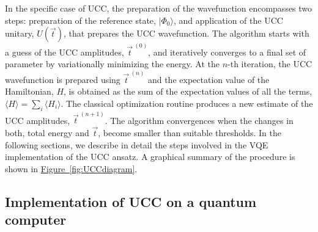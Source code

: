 \documentclass[superscriptaddress,aps,pra,twocolumn,nofootinbib,babel]{revtex4-1}
\newcommand{\fig}[1]{\hyperref[fig:#1]{Figure~\ref*{fig:#1}}}
\begin{document}
In the specific case of UCC, the preparation of the wavefunction encompasses two steps: preparation of the reference state, $|\Phi_{0}\rangle$, and application of the UCC unitary, $U(\vec{t})$, that prepares the UCC wavefunction. The algorithm starts with a guess of the UCC amplitudes, $\vec{t}^{\ (0)}$, and iteratively converges to a final set of parameter by variationally minimizing the energy. At the $n$-th iteration, the UCC wavefunction is prepared using $\vec{t}^{\ (n)}$ and the expectation value of the Hamiltonian, $H$, is obtained as the sum of the expectation values of all the terms, $\langle H \rangle = \sum_i \langle H_i \rangle $. The classical optimization routine produces a new estimate of the UCC amplitudes, $\vec{t}^{\ (n+1)}$. The algorithm convergences when the changes in both, total energy and $\vec{t}$, become smaller than suitable thresholds. In the following sections, we describe in detail the steps involved in the VQE implementation of the UCC ansatz. A graphical summary of the procedure is shown in \fig{UCCdiagram}.

\subsection{Implementation of UCC on a quantum computer}




\end{document}
